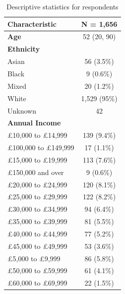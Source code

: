 \documentclass[]{cupjournal}
\begin{document}
\begin{longtable}[t]{lc}
\caption{\label{tab:DescriptiveResp}\label{tab:Descriptive}Descriptive statistics for respondents}\\
\toprule
\textbf{Characteristic} & \textbf{N = 1,656}\\
\midrule
\textbf{Age} & 52 (20, 90)\\
\textbf{Ethnicity} & \\
\hspace{1em}Asian & 56 (3.5\%)\\
\hspace{1em}Black & 9 (0.6\%)\\
\hspace{1em}Mixed & 20 (1.2\%)\\
\hspace{1em}White & 1,529 (95\%)\\
\hspace{1em}Unknown & 42\\
\textbf{Annual Income} & \\
\hspace{1em}£10,000 to £14,999 & 139 (9.4\%)\\
\hspace{1em}£100,000 to £149,999 & 17 (1.1\%)\\
\hspace{1em}£15,000 to £19,999 & 113 (7.6\%)\\
\hspace{1em}£150,000 and over & 9 (0.6\%)\\
\hspace{1em}£20,000 to £24,999 & 120 (8.1\%)\\
\hspace{1em}£25,000 to £29,999 & 122 (8.2\%)\\
\hspace{1em}£30,000 to £34,999 & 94 (6.4\%)\\
\hspace{1em}£35,000 to £39,999 & 81 (5.5\%)\\
\hspace{1em}£40,000 to £44,999 & 77 (5.2\%)\\
\hspace{1em}£45,000 to £49,999 & 53 (3.6\%)\\
\hspace{1em}£5,000 to £9,999 & 86 (5.8\%)\\
\hspace{1em}£50,000 to £59,999 & 61 (4.1\%)\\
\hspace{1em}£60,000 to £69,999 & 22 (1.5\%)\\

\end{longtable}
\end{document}
